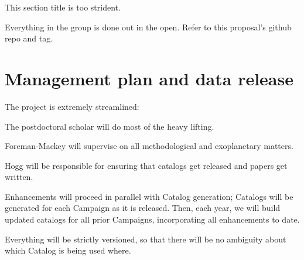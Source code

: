 \documentclass[12pt]{article}
\begin{document}
This section title is too strident.

Everything in the group is done out in the open.
Refer to this proposal's github repo and tag.

\section{Management plan and data release}

The project is extremely streamlined:

The postdoctoral scholar will do most of the heavy lifting.

Foreman-Mackey will supervise on all methodological and exoplanetary
matters.

Hogg will be responsible for ensuring that catalogs get released and
papers get written.

Enhancements will proceed in parallel with Catalog generation;
Catalogs will be generated for each Campaign as it is released.
Then, each year, we will build updated catalogs for all prior
Campaigns, incorporating all enhancements to date.

Everything will be strictly versioned, so that there will be no
ambiguity about which Catalog is being used where.
\end{document}
